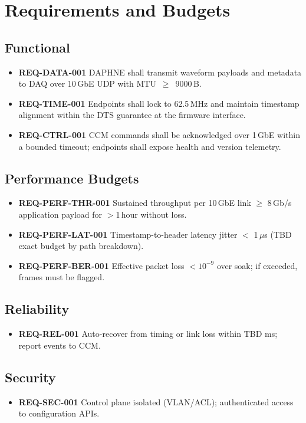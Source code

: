 
\section{Requirements and Budgets}\label{sec:reqs}
\subsection{Functional}
\begin{itemize}
  \item \textbf{REQ-DATA-001} DAPHNE shall transmit waveform payloads and metadata to DAQ over 10\,GbE UDP with MTU~$\ge$~9000\,B.
  \item \textbf{REQ-TIME-001} Endpoints shall lock to 62.5\,MHz and maintain timestamp alignment within the DTS guarantee at the firmware interface.
  \item \textbf{REQ-CTRL-001} CCM commands shall be acknowledged over 1\,GbE within a bounded timeout; endpoints shall expose health and version telemetry.
\end{itemize}
\subsection{Performance Budgets}
\begin{itemize}
  \item \textbf{REQ-PERF-THR-001} Sustained throughput per 10\,GbE link $\ge$ 8\,Gb/s application payload for $>$1\,hour without loss.
  \item \textbf{REQ-PERF-LAT-001} Timestamp-to-header latency jitter $<$ 1\,$\mu$s (TBD exact budget by path breakdown).
  \item \textbf{REQ-PERF-BER-001} Effective packet loss $<10^{-9}$ over soak; if exceeded, frames must be flagged.
\end{itemize}
\subsection{Reliability}
\begin{itemize}
  \item \textbf{REQ-REL-001} Auto-recover from timing or link loss within TBD ms; report events to CCM.
\end{itemize}
\subsection{Security}
\begin{itemize}
  \item \textbf{REQ-SEC-001} Control plane isolated (VLAN/ACL); authenticated access to configuration APIs.
\end{itemize}
